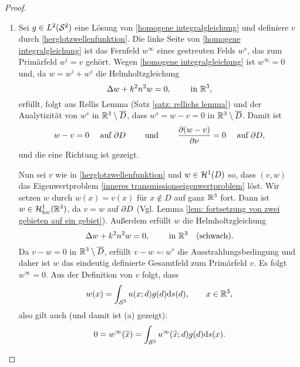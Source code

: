 \begin{proof}\
	\begin{enumerate}[label=(\alph*)]
		\item Sei \(g\in L^2(\mathcal{S}^2)\) eine Lösung von \eqref{homogene integralgleichung} und definiere \(v\) durch \eqref{herglotzwellenfunktion}. Die linke Seite von \eqref{homogene integralgleichung} ist das Fernfeld \(w^\infty\) eines gestreuten Felds \(w^s\), das zum Primärfeld \(w^i=v\) gehört. Wegen \eqref{homogene integralgleichung} ist \(w^\infty=0\) und, da \(w=w^i+w^s\) die Helmholtzgleichung
		\begin{equation*}
			\Delta w+k^2n^2w=0,\qquad\text{ in }\mathbb{R}^3,
		\end{equation*}
		erfüllt, folgt aus Rellis Lemma (Satz \ref{satz: rellichs lemma}) und der Analytizität von \(w^s\) in \(\mathbb{R}^3\setminus\overline{D}\), dass \(w^s=w-v=0\) in \(\mathbb{R}^3\setminus\overline{D}\). Damit ist 
		\begin{equation*}
			w-v=0\quad\text{ auf }\partial D\qquad\text{ und }\qquad\frac{\partial(w-v)}{\partial\nu}=0\quad\text{ auf }\partial D,
		\end{equation*}
		und die eine Richtung ist gezeigt.\vspace{2mm}
		
		Nun sei \(v\) wie in \eqref{herglotzwellenfunktion} und \(w\in\mathcal{H}^1(D)\) so, dass \((v,w)\) das Eigenwertproblem \eqref{inneres transmissionseigenwertproblem} löst. Wir setzen \(w\) durch \(w(x)=v(x)\) für \(x\notin D\) auf ganz \(\mathbb{R}^3\) fort. Dann ist \(w\in\mathcal{H}_{\mathrm{loc}}^1(\mathbb{R}^3)\), da \(v=w\) auf \(\partial D\) (Vgl. Lemma \ref{lem: fortsetzung von zwei gebieten auf ein gebiet}). Außerdem erfüllt \(w\) die Helmholtzgleichung
		\begin{equation*}
			\Delta w+k^2n^2w=0,\qquad\text{ in }\mathbb{R}^3\quad\text{(schwach).}
		\end{equation*}
		Da \(v-w=0\) in \(\mathbb{R}^3\setminus\overline{D}\), erfüllt \(v-w\eqqcolon w^s\) die Ausstrahlungsbedingung und daher ist \(w\) das eindeutig definierte Gesamtfeld zum Primärfeld \(v\). Es folgt \(w^\infty=0\). Aus der Definition von \(v\) folgt, dass
		\begin{equation*}
			w(x)=\int_{\mathcal{S}^2}u(x;d)g(d)\mathrm{d}s(d),\qquad x\in\mathbb{R}^3,
		\end{equation*}
		also gilt auch (und damit ist (a) gezeigt):
		\begin{equation*}
			0=w^\infty(\widehat{x})=\int_{\mathcal{S}^2}u^\infty(\widehat{x};d)g(d)\mathrm{d}s(x).
		\end{equation*}
	

\end{enumerate}
\end{proof}
